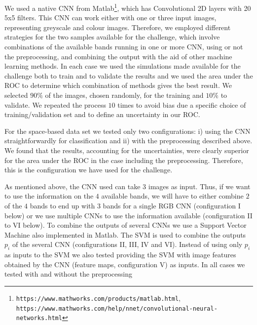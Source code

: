 \documentclass[useAMS,usenatbib]{mnras}
\begin{document}
We used a native CNN from Matlab\footnote{\texttt{https://www.mathworks.com/products/matlab.html}, \texttt{https://www.mathworks.com/help/nnet/convolutional-neural-networks.html}}, which has Convolutional 2D layers with 20 5x5 filters. This CNN can work either with one or three input images, representing greyscale and colour images.
Therefore, we employed different strategies for the two samples available for the challenge, which involve combinations of the available bands running in one or more CNN, using or not the preprocessing, and combining the output with the aid of other machine learning methods.
In each case we used the simulations made available for the challenge both to train and to validate the results and we used the area under the ROC to determine which combination of methods gives the best result.    
We selected 
$90\%$ of the images, chosen randomly, for the training and $10\%$ to validate. We repeated the process $10$ times to avoid bias due a specific choice of training/validation set and to define an uncertainty in our ROC.

For the space-based data set we tested only two configurations: i) using the CNN straightforwardly for classification and ii) with the preprocessing described above. 
We found that the results, accounting for the uncertainties,  
were clearly superior for the area under the ROC in the case 
including the preprocessing. Therefore, this is the configuration we have used for the challenge. 

As mentioned above, the CNN used can take 3 images as input. Thus, if we want to use the information on the $4$ available bands, we will have to either combine $2$ of the $4$ bands to end up with $3$ bands for a single RGB CNN (configuration I below) or we use multiple CNNs to use the information available (configuration II to VI below). To combine the outputs of several CNNs we use a Support Vector Machine \citep[hereafter SVM; see e.g., ][]{rebentrost2014quantum} also implemented in Matlab. The SVM is used to combine the outputs $p_i$ of the several CNN (configurations II, III, IV and VI). Instead of using only $p_i$ as inputs to the SVM we also tested providing the SVM with image features obtained by the CNN (feature maps, configuration V) as inputs. In all cases we tested with and without the preprocessing
\end{document}
